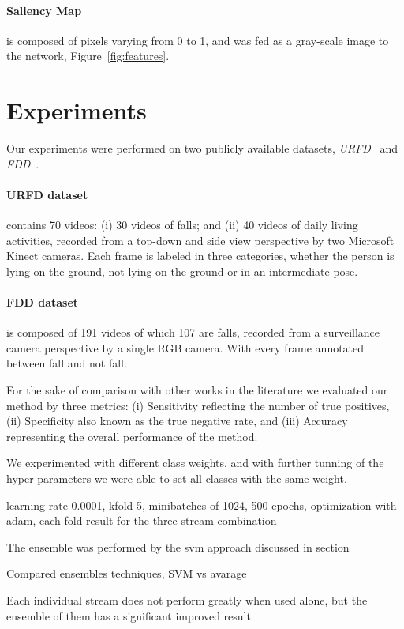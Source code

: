 \documentclass[conference]{IEEEtran}
\begin{document}
\paragraph{Saliency Map} is composed of pixels varying from 0 to 1, and was fed as a gray-scale image to the network, Figure~\ref{fig:features}.

\section{Experiments}
\label{sec:experiments}

Our experiments were performed on two publicly available datasets, \textit{URFD}~\cite{kepski2014human} and \textit{FDD}~\cite{charfi2013optimised}.

\paragraph{URFD dataset} contains 70 videos: (i) 30 videos of falls; and (ii) 40 videos of daily living activities, recorded from a top-down and side view perspective by two Microsoft Kinect cameras. Each frame is labeled in three categories, whether the person is lying on the ground, not lying on the ground or in an intermediate pose.
\paragraph{FDD dataset} is composed of 191 videos of which 107 are falls, recorded from a surveillance camera perspective by a single RGB camera. With every frame annotated between fall and not fall.

For the sake of comparison with other works in the literature we evaluated our method by three metrics: (i) Sensitivity reflecting the number of true positives, (ii) Specificity also known as the true negative rate, and (iii) Accuracy representing the overall performance of the method.

We experimented with different class weights, and with further tunning of the hyper parameters we were able to set all classes with the same weight.

learning rate 0.0001, kfold 5, minibatches of 1024, 500 epochs, optimization with adam, each fold result for the three stream combination

The ensemble was performed by the svm approach discussed in section

Compared ensembles techniques, SVM vs avarage

Each individual stream does not perform greatly when used alone, but the ensemble of them has a significant improved result
\end{document}
